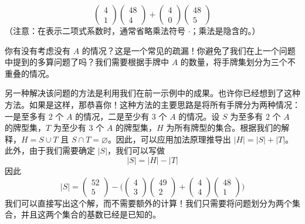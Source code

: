 \begin{example}[最多两张 $A$]
\[\begin{pmatrix}
            4 \\
            1
        \end{pmatrix}\begin{pmatrix}
            48 \\
            4
        \end{pmatrix}+\begin{pmatrix}
            4 \\
            0
        \end{pmatrix}\begin{pmatrix}
            48 \\
            5
        \end{pmatrix}\]
    （注意：在表示二项式系数时，通常省略乘法符号 $\cdot$；乘法是隐含的。）

    你有没有考虑没有 $A$ 的情况？这是一个常见的疏漏！你避免了我们在上一个问题中提到的多算问题了吗？我们需要根据手牌中 $A$ 的数量，将手牌集划分为三个不重叠的情况。

    另一种解决该问题的方法是利用我们在前一示例中的成果。也许你已经想到了这种方法。如果是这样，那恭喜你！这种方法的主要思路是将所有手牌分为两种情况：一是至多有 $2$ 个 $A$ 的情况，二是至少有 $3$ 个 $A$ 的情况。设 $S$ 为至多有 $2$ 个 $A$ 的牌型集，$T$ 为至少有 $3$ 个 $A$ 的牌型集，$H$ 为所有牌型的集合。根据我们的解释，$H = S \cup T$ 且 $S \cap T = \varnothing$。因此，可以应用加法原理推导出 $|H| = |S| + |T|$。此外，由于我们需要确定 $|S|$，我们可以写做
    \[|S| = |H| - |T|\]
    因此
    \[|S| = \begin{pmatrix}
            52 \\
            5
        \end{pmatrix}-\Bigg(\begin{pmatrix}
                4 \\
                3
            \end{pmatrix}\begin{pmatrix}
                49 \\
                2
            \end{pmatrix}+\begin{pmatrix}
                4 \\
                4
            \end{pmatrix}\begin{pmatrix}
                48 \\
                1
            \end{pmatrix}\Bigg)\]
    我们可以直接写出这个解，而不需要额外的计算！我们只需要将问题划分为两个集合，并且这两个集合的基数已经是已知的。


\end{example}
